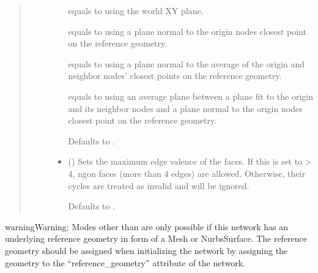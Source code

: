 \documentclass[letterpaper,10pt,english]{sphinxmanual}
\begin{document}
\begin{fulllineitems}
\begin{fulllineitems}
\begin{quote}
\begin{description}
\begin{itemize}
 equals to using the world XY plane.

 equals to using a plane normal to the origin nodes closest
point on the reference geometry.

 equals to using a plane normal to the average of the origin
and neighbor nodes’ closest points on the reference geometry.

 equals to using an average plane between a plane fit to the
origin and its neighbor nodes and a plane normal to the origin
nodes closest point on the reference geometry.

Defaults to .


\item {} 
 (\sphinxstyleliteralemphasis{\sphinxupquote{, }}) \textendash{} 
Sets the maximum edge valence of the faces. If this is set to \textgreater{} 4,
n\sphinxhyphen{}gon faces (more than 4 edges) are allowed. Otherwise, their cycles
are treated as invalid and will be ignored.

Defaults to .


\end{itemize}

\end{description}\end{quote}

\begin{sphinxadmonition}{warning}{Warning:}
Modes other than  are only possible if this network has an
underlying reference geometry in form of a Mesh or NurbsSurface. The
reference geometry should be assigned when initializing the network by
assigning the geometry to the “reference\_geometry” attribute of the
network.
\end{sphinxadmonition}

\end{fulllineitems}



\end{fulllineitems}
\end{document}
